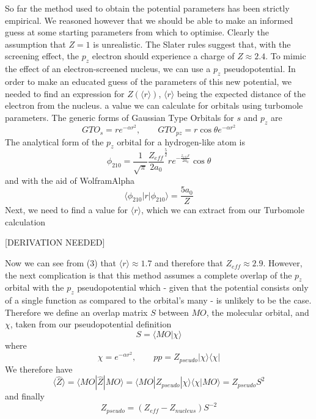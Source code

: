 \documentclass[journal=jctcce,manuscript=article]{achemso}
\begin{document}
So far the method used to obtain the potential parameters has been strictly empirical. We reasoned however that we should be able to make an informed guess at some starting parameters from which to optimise. Clearly the assumption that \(Z = 1\) is unrealistic. The Slater rules suggest that, with the screening effect, the \(p_{z}\) electron should experience a charge of \(Z \approx 2.4\). To mimic the effect of an electron-screened nucleus, we can use a \(p_{z}\) pseudopotential. In order to make an educated guess of the parameters of this new potential, we needed to find an expression for \(Z(\langle r \rangle)\), \( \langle r \rangle \) being the expected distance of the electron from the nucleus. a value we can calculate for orbitals using turbomole parameters.
	The generic forms of Gaussian Type Orbitals for \(s\) and \(p_{z}\) are
\begin{equation}
GTO_{s} = re^{-\alpha r^{2}},\qquad	GTO_{pz} = r \cos \theta e^{-\alpha r^{2}}
\end{equation}
The analytical form of the \(p_{z}\) orbital for a hydrogen-like atom is
\begin{equation}
\phi_{210} = \frac{1}{\sqrt{\pi}} \frac{Z_{eff}}{2a_{0}} ^{\frac{5}{2}} re^{-\frac{z_{eff}r}{2a_{0}}} \cos \theta
\end{equation}
and with the aid of WolframAlpha
\begin{equation}
\langle \phi_{210} | r | \phi_{210} \rangle = \frac{5a_{0}}{Z}
\end{equation}
Next, we need to find a value for \( \langle r \rangle \), which we can extract from our Turbomole calculation

[DERIVATION NEEDED]

Now we can see from (3) that \( \langle r \rangle \approx 1.7\) and therefore that \(Z_{eff} \approx 2.9\). However, the next complication is that this method assumes a complete overlap of the \(p_{z}\) orbital with the \(p_{z}\) pseudopotential which - given that the potential consists only of a single function as compared to the orbital's many - is unlikely to be the case. Therefore we define an overlap matrix \(S\) between \(MO\), the molecular orbital, and \(\chi\), taken from our pseudopotential definition
\begin{equation}
S = \langle MO | \chi \rangle
\end{equation}
where
\begin{equation}
\chi = e^{-\alpha r^{2}},\qquad pp = Z_{pseudo} | \chi \rangle \langle \chi |
\end{equation}
We therefore have
\begin{equation}
\langle \widehat{Z} \rangle = \langle MO | \widehat{Z} | MO \rangle = \langle MO | Z_{pseudo} | \chi \rangle \langle \chi | MO \rangle = Z_{pseudo} S^{2}
\end{equation}
and finally
\begin{equation}
Z_{pseudo} = (Z_{eff} - Z_{nucleus})S^{-2}
\end{equation}
\end{document}
